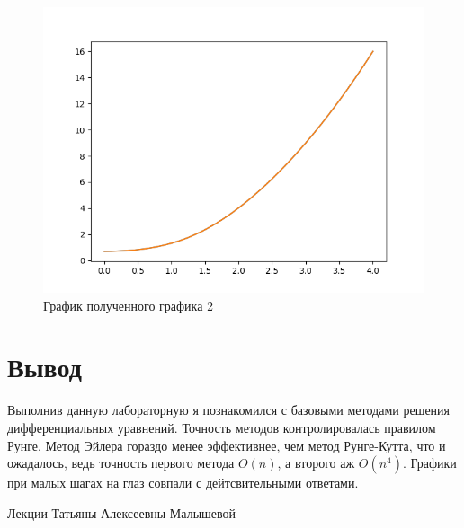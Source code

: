 \documentclass{article}
\begin{document}
\begin{figure}[h]
    \centering
    \includegraphics[totalheight=8cm]{figure-2.png}
    \caption{График полученного графика 2}
\end{figure}

\section{Вывод}

Выполнив данную лабораторную я познакомился с
базовыми методами решения дифференциальных уравнений.
Точность методов контролировалась правилом Рунге.
Метод Эйлера гораздо менее эффективнее, чем метод
Рунге-Кутта, что и ожадалось, ведь точность первого
метода $O(n)$, а второго аж $O(n^4)$. Графики при 
малых шагах на глаз совпали с дейтсвительными ответами.

\begin{thebibliography}{9}

    Лекции Татьяны Алексеевны Малышевой

\end{thebibliography}
\end{document}
